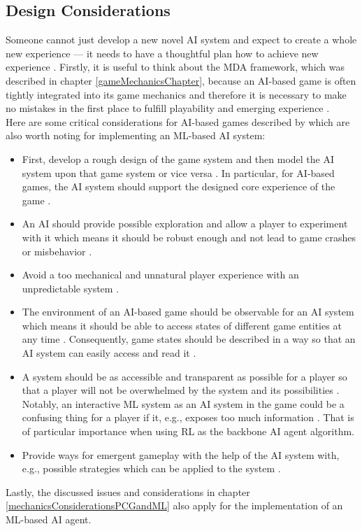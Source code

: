 \documentclass[MGS,Master,english]{twbook}%
\begin{document}
\subsection{Design Considerations}
Someone cannot just develop a new novel AI system and expect to create a whole new experience — it needs to have a thoughtful plan how to achieve new experience \cite{ai::gameDesign}. Firstly, it is useful to think about the MDA framework, which was described in chapter \ref{gameMechanicsChapter}, because an AI-based game is often tightly integrated into its game mechanics and therefore it is necessary to make no mistakes in the first place to fulfill playability and emerging experience \cite{ai::gameDesign}. \\
Here are some critical considerations for AI-based games described by \citep{ai::gameDesign} which are also worth noting for implementing an ML-based AI system: 
\begin{itemize}
	\item First, develop a rough design of the game system and then model the AI system upon that game system or vice versa \cite{ai::gameDesign}. In particular, for AI-based games, the AI system should support the designed core experience of the game \cite{ai::gameDesign}.
	\item An AI should provide possible exploration and allow a player to experiment with it which means it should be robust enough and not lead to game crashes or misbehavior \cite{ai::gameDesign}. 
	\item Avoid a too mechanical and unnatural player experience with an unpredictable system \cite{ai::gameDesign}.
	\item The environment of an AI-based game should be observable for an AI system which means it should be able to access states of different game entities at any time \cite{ai::gameDesign}. Consequently, game states should be described in a way so that an AI system can easily access and read it \cite{ai::book}.
	\item A system should be as accessible and transparent as possible for a player so that a player will not be overwhelmed by the system and its possibilities \cite{ai::gameDesign}. Notably, an interactive ML system as an AI system in the game could be a confusing thing for a player if it, e.g., exposes too much information \cite{ai::gameDesign}. That is of particular importance when using \ac{RL} as the backbone AI agent algorithm.
	\item Provide ways for emergent gameplay with the help of the AI system with, e.g., possible strategies which can be applied to the system \cite{ai::gameDesign}. 
\end{itemize}
Lastly, the discussed issues and considerations in chapter \ref{mechanicsConsiderationsPCGandML} also apply for the implementation of an ML-based AI agent.
\end{document}
